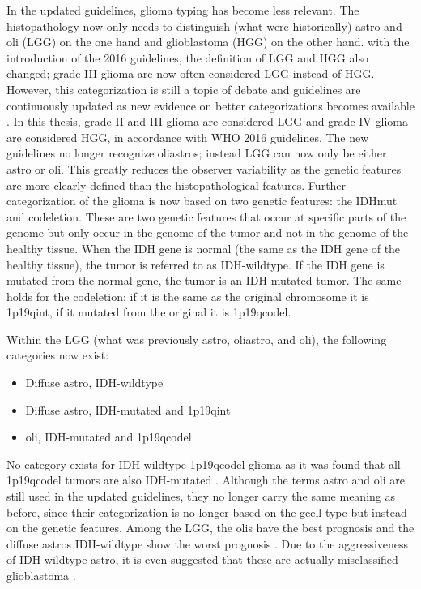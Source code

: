 In the updated guidelines, \gls{glioma} typing has become less relevant.
The histopathology now only needs to distinguish (what were historically) \gls{astro} and \gls{oli} (\gls{LGG}) on the one hand and \gls{glioblastoma} (\gls{HGG}) on the other hand.
with the introduction of the 2016 guidelines, the definition of \gls{LGG} and \gls{HGG} also changed; grade III \gls{glioma} are now often considered \gls{LGG} instead of \gls{HGG}.
However, this categorization is still a topic of debate and guidelines are continuously updated as new evidence on better categorizations becomes available \autocite{lous2020impactnow}.
In this thesis, grade II and III \gls{glioma} are considered \gls{LGG} and grade IV \gls{glioma} are considered \gls{HGG}, in accordance with \gls{WHO} 2016 guidelines.
The new guidelines no longer recognize \glspl{oliastro}; instead \gls{LGG} can now only be either \gls{astro} or \gls{oli}.
This greatly reduces the observer variability as the genetic features are more clearly defined than the histopathological features.
Further categorization of the \gls{glioma} is now based on two genetic features:  the \gls{IDHmut} and \gls{codeletion}.
These are two genetic features that occur at specific parts of the genome but only occur in the genome of the \gls{tumor} and not in the genome of the healthy tissue.
When the \gls{IDH} gene is normal (the same as the \gls{IDH} gene of the healthy tissue), the \gls{tumor} is referred to as \gls{IDH}-wildtype.
If the \gls{IDH} gene is mutated from the normal gene, the \gls{tumor} is an \gls{IDH}-mutated \gls{tumor}.
The same holds for the \gls{codeletion}: if it is the same as the original chromosome it is \acl{1p19qint}, if it mutated from the original it is \acl{1p19qcodel}.

Within the \gls{LGG} (what was previously \gls{astro}, \gls{oliastro}, and \gls{oli}), the following categories now exist:
\begin{itemize}
    \item Diffuse \gls{astro}, \gls{IDH}-wildtype
    \item Diffuse \gls{astro}, \gls{IDH}-mutated and \acl{1p19qint}
    \item \Gls{oli}, \gls{IDH}-mutated and \acl{1p19qcodel}
\end{itemize}
No category exists for \gls{IDH}-wildtype \acl{1p19qcodel} \gls{glioma} as it was found that all \acl{1p19qcodel} \glspl{tumor} are also \gls{IDH}-mutated \autocite{labussi20101p19qcodeletedIDH}.
Although the terms \gls{astro} and \gls{oli} are still used in the updated guidelines, they no longer carry the same meaning as before, since their categorization is no longer based on the \gls{gcell} type but instead on the genetic features.
Among the \gls{LGG}, the \glspl{oli} have the best prognosis and the diffuse \glspl{astro} \gls{IDH}-wildtype show the worst prognosis \autocite{eckel2015gliomagroups}.
Due to the aggressiveness of \gls{IDH}-wildtype \gls{astro}, it is even suggested that these are actually misclassified \gls{glioblastoma} \autocite{hartmann2010IDH1gbm, brat2018IMPACT}.




